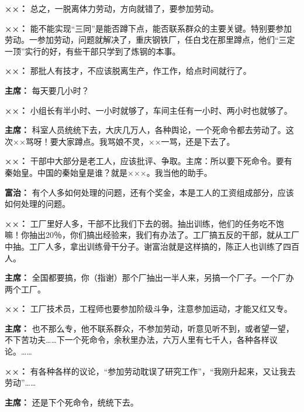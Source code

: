 \begin{duihua}
\item[\textbf{××：}] 总之，一脱离体力劳动，方向就错了，要参加劳动。

\item[\textbf{××：}] 能不能实现“三同”是能否蹲下点，能否联系群众的主要关键。特别要参加劳动。一参加劳动，问题就解决了，重庆钢铁厂，任白戈在那里蹲点，他们“三定一顶”实行的好，有些干部只学到了炼钢的本事。

\item[\textbf{××：}] 那批人有技才，不应该脱离生产，作工作，给点时间就行了。

\item[\textbf{主席：}] 每天要几小时？

\item[\textbf{××：}] 小组长有半小时、一小时就够了，车间主任有一小时、两小时也就够了。

\item[\textbf{主席：}] 科室人员统统下去，大庆几万人，各种舆论，一个死命令都去劳动了。这次××骂呀！要大家蹲点。我骂娘不灵，××一骂，还是下去了。

\item[\textbf{××：}] 干部中大部分是老工人，应该批评、争取。主席：所以要下死命令。要有秦始皇。中国的秦始皇是谁？就是×××。我当他的助手。

\item[\textbf{富治：}] 有个人多如何处理的问题，还有个奖金，本是工人的工资组成部分，应该如何处理的问题。

\item[\textbf{××：}] 工厂里好人多，干部不比我们下去的弱。抽出训练，他们的任务吃不饱嘛！你抽出20％，你们搞出经验来，我们有办法了。工厂搞五反的干部，就从工厂中抽。工厂人多，拿出训练骨干分子。谢富治就是这样搞的，陈正人也训练了四百人。

\item[\textbf{主席：}] 全国都要搞，你（指谢）那个厂抽出一半人来，另搞一个厂子。一个厂办两个工厂。

\item[\textbf{××：}] 工厂技术员，工程师也要参加阶级斗争，注意参加运动，才能又红又专。

\item[\textbf{主席：}] 也不那么专，他不联系群众，不参加劳动，听意见听不到，或者望一望，不下苦功夫……下一个死命令，余秋里办法，六万人里有七千人，各种各样议论。……

\item[\textbf{××：}] 有各种各样的议论，“参加劳动耽误了研究工作”，“我刚升起来，又让我去劳动”……

\item[\textbf{主席：}] 还是下个死命令，统统下去。


\end{duihua}
